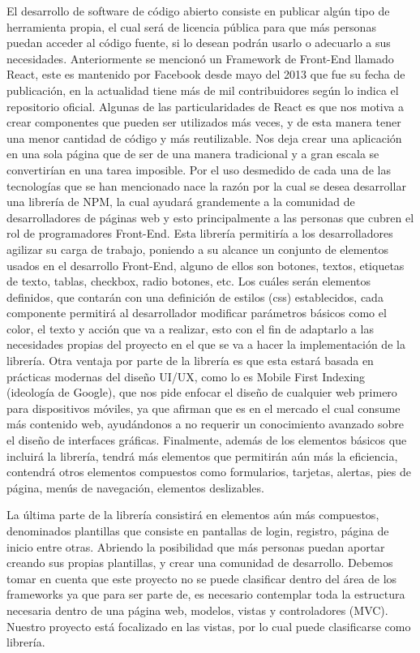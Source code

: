 El desarrollo de software de código abierto consiste en publicar algún tipo de herramienta propia, el cual será de licencia pública para que más personas puedan acceder al código fuente, si lo desean podrán usarlo o adecuarlo a sus necesidades. 
Anteriormente se mencionó un Framework de Front-End llamado React, este es mantenido por Facebook desde mayo del 2013 que fue su fecha de publicación, en la actualidad tiene más de mil contribuidores según lo indica el repositorio oficial. 
Algunas de las particularidades de React es que nos motiva a crear componentes que pueden ser utilizados más veces, y de esta manera tener una menor cantidad de código y más reutilizable. 
Nos deja crear una aplicación en una sola página que de ser de una manera tradicional y a gran escala se convertirían en una tarea imposible.
\newline
Por el uso desmedido de cada una de las tecnologías que se han mencionado nace la razón por la cual se desea desarrollar una librería de NPM, la cual ayudará grandemente a la comunidad de desarrolladores de páginas web y esto principalmente a las personas que cubren el rol de programadores Front-End. 
Esta librería permitiría a los desarrolladores agilizar su carga de trabajo, poniendo a su alcance un conjunto de elementos usados en el desarrollo Front-End, alguno de ellos son botones, textos, etiquetas de texto, tablas, checkbox, radio botones, etc.  Los cuáles serán elementos definidos, que contarán con una definición de estilos (css) establecidos, cada componente permitirá al desarrollador modificar parámetros básicos como el color, el texto y acción que va a realizar, esto con el fin de adaptarlo a las necesidades propias del proyecto en el que se va a hacer la implementación de la librería.  
Otra ventaja por parte de la librería es que esta estará basada en prácticas modernas del diseño UI/UX, como lo es Mobile First Indexing (ideología de Google), que nos pide enfocar el diseño de cualquier web primero para dispositivos móviles, ya que afirman que es en el mercado el cual consume más contenido web, ayudándonos a no requerir un conocimiento avanzado sobre el diseño de interfaces gráficas. 
Finalmente, además de los elementos básicos que incluirá la librería, tendrá más elementos que permitirán aún más la eficiencia, contendrá otros elementos compuestos como formularios, tarjetas, alertas, pies de página, menús de navegación, elementos deslizables. 

La última parte de la librería consistirá en elementos aún más compuestos, denominados plantillas que consiste en pantallas de login, registro, página de inicio entre otras. Abriendo la posibilidad que más personas puedan aportar creando sus propias plantillas, y crear una comunidad de desarrollo.  
Debemos tomar en cuenta que este proyecto no se puede clasificar dentro del área de los frameworks ya que para ser parte de, es necesario contemplar toda la estructura necesaria dentro de una página web, modelos, vistas y controladores (MVC). Nuestro proyecto está focalizado en las vistas, por lo cual puede clasificarse como librería.  
  
